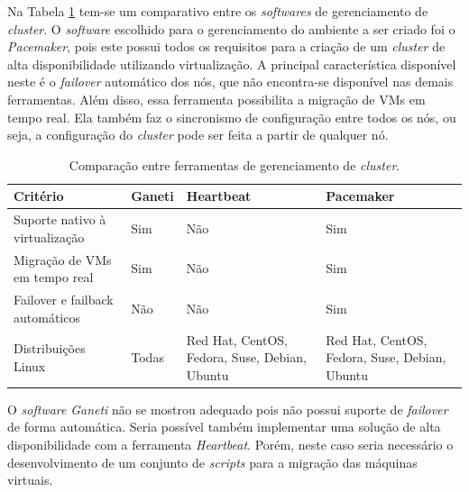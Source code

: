 Na Tabela \ref{tab:clusterger} tem-se um comparativo entre os \textit{softwares} de gerenciamento de \textit{cluster}. O \textit{software} 
escolhido para o gerenciamento do ambiente a ser criado foi o \textit{Pacemaker}, pois este possui todos os requisitos para a criação de um 
\textit{cluster} de alta disponibilidade utilizando virtualização. A principal característica disponível neste é o \textit{failover} automático
dos nós, que não encontra-se disponível nas demais ferramentas. Além disso, essa ferramenta possibilita a migração de \acp{VM} em tempo real. 
Ela também faz o sincronismo de configuração entre todos os nós, ou seja, a configuração do \textit{cluster} pode ser feita a partir de qualquer nó. 

\begin{table}[h!]
\caption{Comparação entre ferramentas de gerenciamento de \textit{cluster}.}
\label{tab:clusterger}
\begin{center}
\begin{tabular}{|l|p{2cm}|p{3.5cm}|p{3.5cm}|}\hline
\textbf{Critério} & \textbf{Ganeti} & \textbf{Heartbeat} & \textbf{Pacemaker} \\\hline
Suporte nativo à virtualização & Sim & Não & Sim \\\hline
Migração de \acp{VM} em tempo real & Sim & Não & Sim \\\hline
Failover e failback automáticos & Não & Não & Sim \\\hline
Distribuições Linux & Todas & Red Hat, CentOS, Fedora, Suse, Debian, Ubuntu & Red Hat, CentOS, Fedora, Suse, Debian, Ubuntu \\\hline
\end{tabular}
\end{center}
\end{table}

O \textit{software} \textit{Ganeti} não se mostrou adequado pois não possui suporte de \textit{failover} de forma automática. 
Seria possível também implementar uma solução de alta disponibilidade com a ferramenta \textit{Heartbeat}. Porém, neste caso seria necessário 
o desenvolvimento de um conjunto de \textit{scripts} para a migração das máquinas virtuais.

